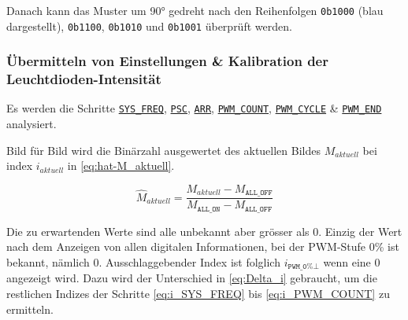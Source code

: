 \strut Danach kann das Muster um 90° gedreht nach den Reihenfolgen \texttt{0b1000} (blau dargestellt), \texttt{0b1100}, \texttt{0b1010} und \texttt{0b1001} überprüft werden.


\subsubsection{Übermitteln von Einstellungen \& Kalibration der Leuchtdioden-Intensität} %

Es werden die Schritte \hyperlink{order:step4}{\texttt{SYS\_FREQ}}, \hyperlink{order:step5}{\texttt{PSC}}, \hyperlink{order:step6}{\texttt{ARR}}, \hyperlink{order:step7}{\texttt{PWM\_COUNT}}, \hyperlink{order:step8}{\texttt{PWM\_CYCLE}} \& \hyperlink{order:step9}{\texttt{PWM\_END}} analysiert.

\label{sec:Erkennen-aller-Binärwerte}

Bild für Bild wird die Binärzahl ausgewertet des aktuellen Bildes $M_\textit{aktuell}$ bei index $i_\textit{aktuell}$ in \eqref{eq:hat-M_aktuell}.

\begin{equation}\label{eq:hat-M_aktuell}
  \widehat{M}_{\textit{aktuell}} = \frac{M_{\textit{aktuell}} - M_{\texttt{ALL\_OFF}} }{M_{\texttt{ALL\_ON}} - M_{\texttt{ALL\_OFF}} }
\end{equation}

Die zu erwartenden Werte sind alle unbekannt aber grösser als $0$.
Einzig der Wert nach dem Anzeigen von allen digitalen Informationen, bei der PWM-Stufe 0\% ist bekannt, nämlich $0$.
Ausschlaggebender Index ist folglich $i_{\texttt{PWM\_0\%}\bot}$ wenn eine $0$ angezeigt wird.
Dazu wird der Unterschied in \eqref{eq:Delta_i} gebraucht, um
die restlichen Indizes der Schritte  \eqref{eq:i_SYS_FREQ} bis  \eqref{eq:i_PWM_COUNT} zu ermitteln.

